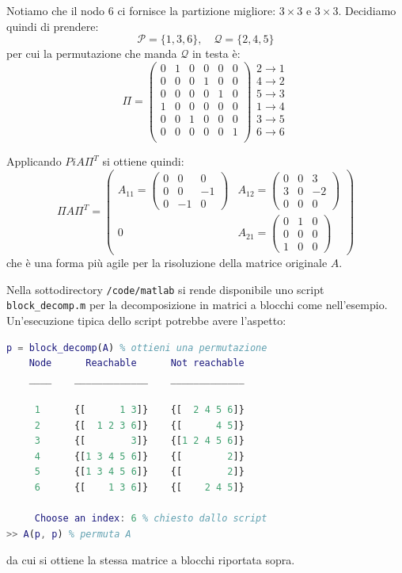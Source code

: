 \documentclass[a4paper,11pt]{article}
\begin{document}
Notiamo che il nodo 6 ci fornisce la partizione migliore: $3 \times 3$ e $3 \times 3$.
Decidiamo quindi di prendere:
$$
\mathcal{P} = \{ 1, 3, 6 \}, \quad \mathcal{Q} = \{ 2, 4, 5 \}
$$
per cui la permutazione che manda $\mathcal{Q}$ in testa è:
$$
\Pi = \begin{pmatrix}
	0 & 1 & 0 & 0 & 0 & 0 \\
	0 & 0 & 0 & 1 & 0 & 0 \\
	0 & 0 & 0 & 0 & 1 & 0 \\
	1 & 0 & 0 & 0 & 0 & 0 \\
	0 & 0 & 1 & 0 & 0 & 0 \\
	0 & 0 & 0 & 0 & 0 & 1 \\
\end{pmatrix}
\begin{array}{c}
	2 \rightarrow 1 \\
	4 \rightarrow 2 \\
	5 \rightarrow 3 \\
	1 \rightarrow 4 \\
	3 \rightarrow 5 \\
	6 \rightarrow 6 \\
\end{array}
$$

Applicando $Pi A \Pi^T$ si ottiene quindi:
$$
\Pi A \Pi^T = \begin{pmatrix}
	A_{11} =
	\begin{pmatrix}
		0 &  0 &  0 \\
		0 &  0 & -1 \\
		0 & -1 &  0
	\end{pmatrix} &
	A_{12} = 
	\begin{pmatrix}
		0 &  0 &  3 \\
		3 &  0 & -2 \\
		0 &  0 &  0
	\end{pmatrix} \\
	0 &
	A_{21} = 
	\begin{pmatrix}
		0 &  1 &  0 \\
		0 &  0 &  0 \\
		1 &  0 &  0
	\end{pmatrix}
\end{pmatrix}
$$
che è una forma più agile per la risoluzione della matrice originale $A$.

Nella sottodirectory \lstinline|/code/matlab| si rende disponibile uno script \lstinline|block_decomp.m| per la decomposizione in matrici a blocchi come nell'esempio.
Un'esecuzione tipica dello script potrebbe avere l'aspetto:
\begin{lstlisting}[language=matlab, style=codestyle]	
p = block_decomp(A) % ottieni una permutazione
    Node      Reachable      Not reachable
    ____    _____________    _____________

     1      {[      1 3]}    {[  2 4 5 6]}
     2      {[  1 2 3 6]}    {[      4 5]}
     3      {[        3]}    {[1 2 4 5 6]}
     4      {[1 3 4 5 6]}    {[        2]}
     5      {[1 3 4 5 6]}    {[        2]}
     6      {[    1 3 6]}    {[    2 4 5]}
   
	 Choose an index: 6 % chiesto dallo script
>> A(p, p) % permuta A
\end{lstlisting}
da cui si ottiene la stessa matrice a blocchi riportata sopra.
\end{document}
